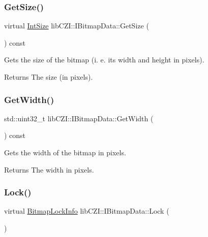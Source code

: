 \subsubsection{\texorpdfstring{Get\+Size()}{GetSize()}}
{\footnotesize\ttfamily virtual \hyperlink{structlib_c_z_i_1_1_int_size}{Int\+Size} lib\+C\+Z\+I\+::\+I\+Bitmap\+Data\+::\+Get\+Size (\begin{DoxyParamCaption}{ }\end{DoxyParamCaption}) const\hspace{0.3cm}{\ttfamily [pure virtual]}}

Gets the size of the bitmap (i. e. its width and height in pixels).

\begin{DoxyReturn}{Returns}
The size (in pixels). 
\end{DoxyReturn}
\mbox{\label{classlib_c_z_i_1_1_i_bitmap_data_aa2638991a88c736ff4e6c42dc4c6c5c7}} 
\subsubsection{\texorpdfstring{Get\+Width()}{GetWidth()}}
{\footnotesize\ttfamily std\+::uint32\+\_\+t lib\+C\+Z\+I\+::\+I\+Bitmap\+Data\+::\+Get\+Width (\begin{DoxyParamCaption}{ }\end{DoxyParamCaption}) const\hspace{0.3cm}{\ttfamily [inline]}}

Gets the width of the bitmap in pixels.

\begin{DoxyReturn}{Returns}
The width in pixels. 
\end{DoxyReturn}
\mbox{\label{classlib_c_z_i_1_1_i_bitmap_data_afbdfc7266b37850cfb53d5106bfd4f44}} 
\subsubsection{\texorpdfstring{Lock()}{Lock()}}
{\footnotesize\ttfamily virtual \hyperlink{structlib_c_z_i_1_1_bitmap_lock_info}{Bitmap\+Lock\+Info} lib\+C\+Z\+I\+::\+I\+Bitmap\+Data\+::\+Lock (\begin{DoxyParamCaption}{ }\end{DoxyParamCaption})\hspace{0.3cm}{\ttfamily [pure virtual]}}

